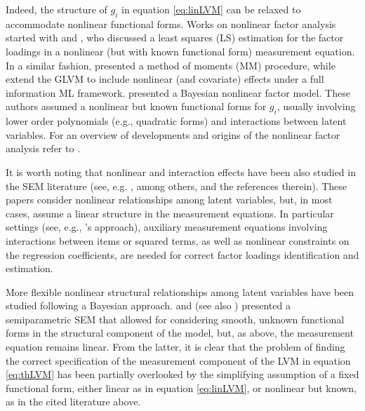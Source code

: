 \documentclass[11pt, a4paper]{article}
\begin{document}
Indeed, the structure of $g_i$ in equation \eqref{eq:linLVM} can be relaxed to accommodate nonlinear functional forms. Works on nonlinear factor analysis started with \citet{McDonald_Psychometrika1962, McDonald_BJMSP1965, McDonald_BJMSP1967, McDonald_Psychometrika1967} and \citet{Etezadi-Amoli&McDonald_Psychometrika1983}, who discussed a least squares (LS) estimation for the factor loadings in a nonlinear (but with known functional form) measurement equation. In a similar fashion, \citet{Yalcin&Amemiya_StatSci2001} presented a method of moments (MM) procedure, while \citet{Rizopoulos&Moustaki_BJMSP2008} extend the GLVM to include nonlinear (and covariate) effects under a full information ML framework. \citet{Zhu&Lee_BJMSP1999} presented a Bayesian nonlinear factor model. These authors assumed a nonlinear but known functional forms for $g_i$, usually involving lower order polynomials (e.g., quadratic forms) and interactions between latent variables. For an overview of developments and origins of the nonlinear factor analysis refer to \citet{Wall&Amemiya_FA2007}.


It is worth noting that nonlinear and interaction effects have been also studied in the SEM literature (see, e.g. \citealp{Kenny&Judd_PsychBull1984, Arminger&Muthen_Psychometrika1998, Klein&Moosbrugger_Psychometrika2000, Wall&Amemiya_JofEdBehSta2001, Lee&Zhu_Psychometrika2002, Bauer_SEM2005, Fahrmeir&Raach_Psychometrika2007, Yang&Dunson_Psychometrika2010,  Kelava&Nagengast_MultBehRes2012}, among others, and the references therein). These papers consider nonlinear relationships among latent variables, but, in most cases, assume a linear structure in the measurement equations. In particular settings (see, e.g., \citeauthor{Kenny&Judd_PsychBull1984}'s approach), auxiliary measurement equations involving interactions between items or squared terms, as well as nonlinear constraints on the regression coefficients, are needed for correct factor loadings identification and estimation.

More flexible nonlinear structural relationships among latent variables have been studied following a Bayesian approach. \citet{Song&Lu_JofCGStats2010} and \citet{SongEtAl_Psychometrika2013} (see also \citealp{Finch_SEM2015}) presented a semiparametric SEM that allowed for considering smooth, unknown functional forms in the structural component of the model, but, as above, the measurement equation remains linear. From the latter, it is clear that the problem of finding the correct specification of the measurement component of the LVM in equation \eqref{eq:thLVM} has been partially overlooked by the simplifying assumption of a fixed functional form, either linear as in equation \eqref{eq:linLVM}, or nonlinear but known, as in the cited literature above.
\end{document}
